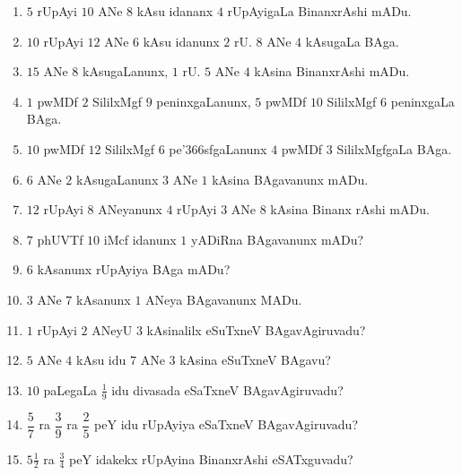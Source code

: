 \begin{enumerate}[\rm(1)]
\item $5$ rUpAyi $10$ ANe $8$ kAsu idananx $4$ rUpAyigaLa BinanxrAshi mADu.

\item $10$ rUpAyi $12$ ANe $6$ kAsu idanunx $2$ rU. $8$ ANe $4$ kAsugaLa BAga.

\item $15$ ANe $8$ kAsugaLanunx, $1$ rU. $5$ ANe $4$ kAsina BinanxrAshi mADu.

\item $1$ pwMDf $2$ SililxMgf $9$ peninxgaLanunx, $5$ pwMDf $10$ SililxMgf $6$ peninxgaLa BAga.

\item $10$ pwMDf $12$ SililxMgf $6$ pe\char'366sfgaLanunx $4$ pwMDf $3$ SililxMgfgaLa BAga.

\item $6$ ANe $2$ kAsugaLanunx $3$ ANe $1$ kAsina BAgavanunx mADu.

\item $12$ rUpAyi $8$ ANeyanunx $4$ rUpAyi $3$ ANe $8$ kAsina Binanx rAshi mADu.

\item $7$ phUVTf $10$ iMcf idanunx $1$ yADiRna BAgavanunx mADu?

\item $6$ kAsanunx rUpAyiya BAga mADu?

\item $3$ ANe $7$ kAsanunx $1$ ANeya BAgavanunx MADu.

\item $1$ rUpAyi $2$ ANeyU $3$ kAsinalilx  eSuTxneV BAgavAgiruvadu?

\item $5$ ANe $4$ kAsu idu $7$ ANe $3$ kAsina eSuTxneV BAgavu?

\item $10$ paLegaLa $\frac{1}{9}$ idu divasada eSaTxneV BAgavAgiruvadu?

\item $\dfrac{5}{7}$ ra $\dfrac{3}{9}$ ra $\dfrac{2}{5}$ peY idu rUpAyiya eSaTxneV BAgavAgiruvadu?

\item $5\frac{1}{2}$ ra $\frac{3}{4}$ peY idakekx rUpAyina BinanxrAshi eSATxguvadu?
\end{enumerate}
